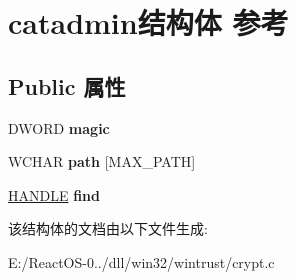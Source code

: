 \hypertarget{structcatadmin}{}\section{catadmin结构体 参考}
\label{structcatadmin}
\subsection*{Public 属性}
\begin{DoxyCompactItemize}
\item 
\mbox{\label{structcatadmin_a444c388979ff548f3fe6adca21012f3b}} 
D\+W\+O\+RD {\bfseries magic}
\item 
\mbox{\label{structcatadmin_a2a139ac4491d05fe96d07a45c91626fa}} 
W\+C\+H\+AR {\bfseries path} \mbox{[}M\+A\+X\+\_\+\+P\+A\+TH\mbox{]}
\item 
\mbox{\label{structcatadmin_af0edd29f4ade196c3865f997b7e5dff6}} 
\hyperlink{interfacevoid}{H\+A\+N\+D\+LE} {\bfseries find}
\end{DoxyCompactItemize}


该结构体的文档由以下文件生成\+:\begin{DoxyCompactItemize}
\item 
E\+:/\+React\+O\+S-\/0../dll/win32/wintrust/crypt.\+c\end{DoxyCompactItemize}
